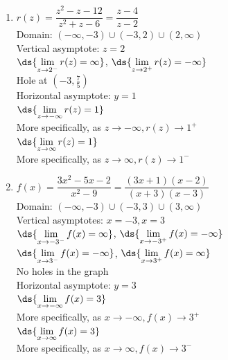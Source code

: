 \documentclass{ximera}
\begin{document}
\begin{multicols}{2}
\begin{enumerate}
\setcounter{enumi}{\value{HW}}

\item $r(z) = \dfrac{z^2-z-12}{z^{2} +z - 6} = \dfrac{z-4}{z - 2}$\\
Domain: $(-\infty, -3) \cup (-3, 2) \cup (2, \infty)$\\
Vertical asymptote: $z = 2$\\
$\ds{\lim_{z \rightarrow 2^{-}} r(z)=  \infty}$, $\ds{\lim_{z \rightarrow 2^{+}} r(z)=  -\infty}$ \\
Hole at $\left(-3, \frac{7}{5} \right)$ \\
Horizontal asymptote: $y = 1$ \\
$\ds{\lim_{z \rightarrow - \infty} r(z) =1}$\\
More specifically, as $z \rightarrow -\infty, r(z) \rightarrow 1^{+}$\\
$\ds{\lim_{z \rightarrow  \infty} r(z) =1}$\\
More specifically, as $z \rightarrow \infty, r(z) \rightarrow 1^{-}$\\


\vfill

\columnbreak

\item $f(x) = \dfrac{3x^2-5x-2}{x^{2} -9} = \dfrac{(3x+1)(x-2)}{(x + 3)(x - 3)}$\\
Domain: $(-\infty, -3) \cup (-3, 3) \cup (3, \infty)$\\
Vertical asymptotes: $x = -3, x = 3$\\
$\ds{\lim_{x \rightarrow -3^{-}} f(x)=  \infty}$, $\ds{\lim_{x \rightarrow -3^{+}} f(x)=  -\infty}$ \\
$\ds{\lim_{x \rightarrow 3^{-}} f(x)=  -\infty}$, $\ds{\lim_{x \rightarrow 3^{+}} f(x)=  \infty}$ \\
No holes in the graph\\
Horizontal asymptote: $y = 3$ \\
$\ds{\lim_{x \rightarrow   -\infty} f(x)  =3}$\\
More specifically, as $x \rightarrow -\infty, f(x) \rightarrow 3^{+}$\\
$\ds{\lim_{x \rightarrow \infty} f(x)  =3}$\\
More specifically, as $x \rightarrow \infty, f(x) \rightarrow 3^{-}$\\

\setcounter{HW}{\value{enumi}}
\end{enumerate}
\end{multicols}
\end{document}
